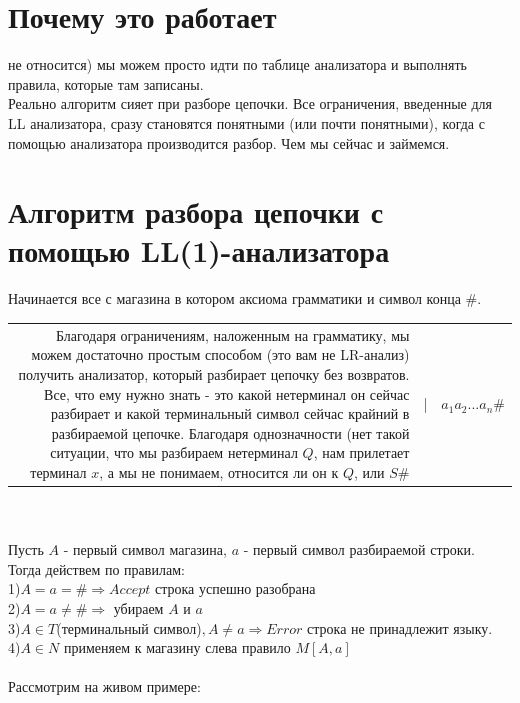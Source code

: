 \documentclass[14pt]{extreport}
\begin{document}
	\section{Почему это работает}
	не относится) мы можем просто идти по таблице анализатора и выполнять правила, которые там
	записаны.\\
	Реально алгоритм сияет при разборе цепочки. Все ограничения, введенные для LL анализатора,
	сразу становятся понятными (или почти понятными), когда с помощью анализатора производится
	разбор. Чем мы сейчас и займемся.
	\section{Алгоритм разбора цепочки с помощью LL(1)-анализатора}
	Начинается все с магазина в котором аксиома грамматики и символ конца $\#$.\\
	\begin{tabular}{rcl}
	Благодаря ограничениям, наложенным на грамматику, мы можем достаточно простым способом (это
	вам не LR-анализ) получить анализатор, который разбирает цепочку без возвратов. Все, что ему
	нужно знать - это какой нетерминал он сейчас разбирает и какой терминальный символ сейчас
	крайний в разбираемой цепочке. Благодаря однозначности (нет такой ситуации, что мы разбираем
	нетерминал $Q$, нам прилетает терминал $x$, а мы не понимаем, относится ли он к $Q$, или
		$S\#$ & | & $a_1a_2...a_n\#$
	\end{tabular}\\\\
	Пусть $A$ - первый символ магазина, $a$ - первый символ разбираемой строки.\\
	Тогда действем по правилам:\\
	\hspace*{30pt}1)$A=a=\# \Rightarrow Accept$ строка успешно разобрана\\
	\hspace*{30pt}2)$A=a \neq \# \Rightarrow$ убираем $A$ и $a$\\
	\hspace*{30pt}3)$A \in T$(терминальный символ)$,A \neq a \Rightarrow Error$ строка не
	принадлежит языку.\\
	\hspace*{30pt}4)$A \in N$ применяем к магазину слева правило $M[A, a]$\\\\
	Рассмотрим на живом примере:\\
\end{document}
